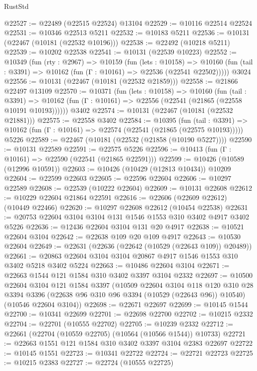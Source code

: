 \begin{lexlean}{RustStd}
\begin{coremodule}
@22527 := @22489 (@22515 @22524) @13104
@22529 := @10116 @22514 @22524
@22531 := @10346 @22513 @5211
@22532 := @10183 @5211
@22536 := @10131 (@22467 (@10181 (@22532 @10196)))
@22538 := @22492 (@10218 @5211)
@22539 := @10202 @22538
@22541 := @10131 (@22539 @10223)
@22552 := @10349
    (fun (rty : @2967) =>
    @10159
      (fun (lets : @10158) =>
      @10160 (fun (tail : @3391) => @10162 (fun (Γ : @10161) => @22536 (@22541 @22502)))))
    @3024
@22556 := @10131 (@22467 (@10181 (@22532 @21859)))
@22558 := @21866 @22497 @13109
@22570 := @10371
    (fun (lets : @10158) =>
    @10160
      (fun (tail : @3391) =>
      @10162 (fun (Γ : @10161) => @22556 (@22541 (@21865 (@22558 @10191 @10193))))))
    @3402
@22574 := @10131 (@22467 (@10181 (@22532 @21881)))
@22575 := @22558 @3402
@22584 := @10395
    (fun (tail : @3391) => @10162 (fun (Γ : @10161) => @22574 (@22541 (@21865 (@22575 @10193)))))
    @5226
@22589 := @22467 (@10181 (@22532 (@21858 (@10190 @5227))))
@22590 := @10131 @22589
@22591 := @22575 @5226
@22596 := @10413 (fun (Γ : @10161) => @22590 (@22541 (@21865 @22591)))
@22599 := @10426 (@10589 (@12996 @10591))
@22603 := @10426 (@10429 (@12813 @10434)) @10209
@22604 := @22599 @22603
@22605 := @22596 @22604
@22606 := @10297 @22589
@22608 := @22539 (@10222 @22604)
@22609 := @10131 @22608
@22612 := @10229 @22604 @21864 @22591
@22616 := @22606 (@22609 @22612) (@10449 @22466)
@22620 := @10297 @22608 @22612 (@10454 @22538)
@22631 := @20753 @22604 @3104 @3104 @131 @1546 @1553 @310 @3402 @4917 @3402 @5226
@22636 := @12436 @22604 @3104 @131 @20 @4917
@22638 := @10521 @22604 @3104
@22642 := @22638 @109 @20 @109 @4917
@22643 := @10530 @22604
@22649 := @22631 (@22636 (@22642 (@10529 (@22643 @109)) @20489))
@22661 := @20863 @22604 @3104 @3104 @20867 @4917 @1546 @1553 @310 @3402 @5218 @3402 @5224
@22663 := @10486 @22604 @3104
@22671 := @22663 @1544 @121 @1584 @310 @3402 @3397 @3104 @2332
@22697 := @10500
    @22604
    @3104
    @121
    @1584
    @3397
    (@10509
      @22604
      @3104
      @118
      @120
      @310
      @28
      @3394
      @3396
      (@22638 @96 @310 @96 @3394 (@10529 (@22643 @96)) @10540)
      (@10546 @22604 @3104))
@22698 := @22671 @22697
@22699 := @10145 @1544
@22700 := @10341 @22699
@22701 := @22698 @22700
@22702 := @10215 @2332
@22704 := @22701 (@10555 @22702)
@22705 := @10239 @2332
@22712 := @22661 (@22704 (@10559 @22705) (@10564 (@10566 @1544)) @10733)
@22721 := @22663 @1551 @121 @1584 @310 @3402 @3397 @3104 @2383 @22697
@22722 := @10145 @1551
@22723 := @10341 @22722
@22724 := @22721 @22723
@22725 := @10215 @2383
@22727 := @22724 (@10555 @22725)

\end{coremodule}
\end{lexlean}
